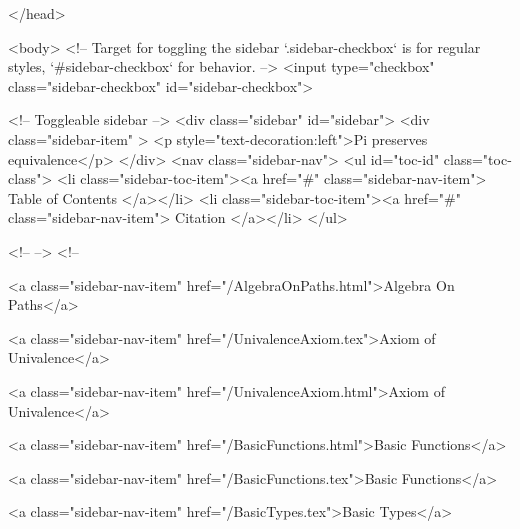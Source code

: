   
</head>




  <body>
    <!-- Target for toggling the sidebar `.sidebar-checkbox` is for regular
     styles, `#sidebar-checkbox` for behavior. -->
<input type="checkbox" class="sidebar-checkbox" id="sidebar-checkbox">

<!-- Toggleable sidebar -->
<div class="sidebar" id="sidebar">
  <div class="sidebar-item" >
    <p style="text-decoration:left">Pi preserves equivalence</p>
  </div>
  <nav class="sidebar-nav">
    <ul id="toc-id" class="toc-class">
  <li class="sidebar-toc-item"><a href="#" class="sidebar-nav-item"> Table of Contents </a></li>
  <li class="sidebar-toc-item"><a href="#" class="sidebar-nav-item"> Citation </a></li>
</ul>


    <!--  -->
    <!-- 
      
    
      
    
      
    
      
        
      
    
      
        
          <a class="sidebar-nav-item" href="/AlgebraOnPaths.html">Algebra On Paths</a>
        
      
    
      
        
          <a class="sidebar-nav-item" href="/UnivalenceAxiom.tex">Axiom of Univalence</a>
        
      
    
      
        
          <a class="sidebar-nav-item" href="/UnivalenceAxiom.html">Axiom of Univalence</a>
        
      
    
      
        
          <a class="sidebar-nav-item" href="/BasicFunctions.html">Basic Functions</a>
        
      
    
      
        
          <a class="sidebar-nav-item" href="/BasicFunctions.tex">Basic Functions</a>
        
      
    
      
        
          <a class="sidebar-nav-item" href="/BasicTypes.tex">Basic Types</a>
        
      
    
      
        
